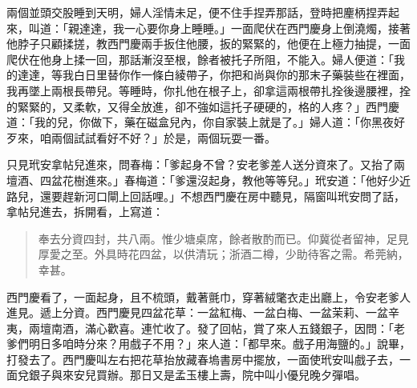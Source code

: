 兩個並頭交股睡到天明，婦人淫情未足，便不住手捏弄那話，登時把麈柄捏弄起來，叫道：「親達達，我一心要你身上睡睡。」一面爬伏在西門慶身上倒澆燭，接著他脖子只顧揉搓，教西門慶兩手扳住他腰，扳的緊緊的，他便在上極力抽提，一面爬伏在他身上揉一回，那話漸沒至根，餘者被托子所阻，不能入。婦人便道：「我的達達，等我白日里替你作一條白綾帶子，你把和尚與你的那末子藥裝些在裡面，我再墜上兩根長帶兒。等睡時，你扎他在根子上，卻拿這兩根帶扎拴後邊腰裡，拴的緊緊的，又柔軟，又得全放進，卻不強如這托子硬硬的，格的人疼？」西門慶道：「我的兒，你做下，藥在磁盒兒內，你自家裝上就是了。」婦人道：「你黑夜好歹來，咱兩個試試看好不好？」於是，兩個玩耍一番。

只見玳安拿帖兒進來，問春梅：「爹起身不曾？安老爹差人送分資來了。又抬了兩壇酒、四盆花樹進來。」春梅道：「爹還沒起身，教他等等兒。」玳安道：「他好少近路兒，還要趕新河口閘上回話哩。」不想西門慶在房中聽見，隔窗叫玳安問了話，拿帖兒進去，拆開看，上寫道：
\begin{quote}
奉去分資四封，共八兩。惟少塘桌席，餘者散酌而已。仰冀從者留神，足見厚愛之至。外具時花四盆，以供清玩；浙酒二樽，少助待客之需。希莞納，幸甚。
\end{quote}

西門慶看了，一面起身，且不梳頭，戴著氈巾，穿著絨氅衣走出廳上，令安老爹人進見。遞上分資。西門慶見四盆花草：一盆紅梅、一盆白梅、一盆茉莉、一盆辛夷，兩壇南酒，滿心歡喜。連忙收了。發了回帖，賞了來人五錢銀子，因問：「老爹們明日多咱時分來？用戲子不用？」來人道：「都早來。戲子用海鹽的。」說畢，打發去了。西門慶叫左右把花草抬放藏春塢書房中擺放，一面使玳安叫戲子去，一面兌銀子與來安兒買辦。那日又是孟玉樓上壽，院中叫小優兒晚夕彈唱。

